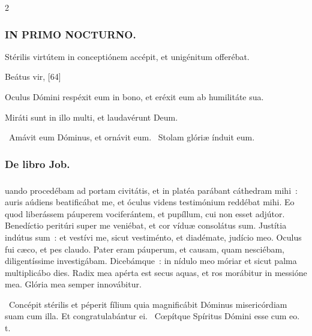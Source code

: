 \documentclass[9pt,twoside]{extarticle}
\begin{document}
\begin{multicols}{2}
{{\subsubsection*{\center \textsc{IN PRIMO NOCTURNO.}}
\begin{tightlist}{}
\item {} Stérilis virtútem in conceptiónem accépit, et unigénitum offerébat.
\item {} Beátus vir,  [64]
\item {} Oculus Dómini respéxit eum in bono, et eréxit eum ab humilitáte sua.
\item {} Miráti sunt in illo multi, et laudavérunt Deum.
\item {}~Amávit eum Dóminus, et ornávit eum. ~Stolam glóriæ índuit eum.
\item {}
\end{tightlist}

\subsubsection*{\center De libro Job.}
\subsubsection*{\center {}}
uando procedébam ad portam civitátis, et in platéa parábant cáthedram mihi~: auris aúdiens beatificábat me, et óculus videns testimónium reddébat mihi. Eo quod liberássem páuperem vociferántem, et pupíllum, cui non esset adjútor. Benedíctio peritúri super me veniébat, et cor víduæ consolátus sum. Justítia indútus sum~: et vestívi me, sicut vestiménto, et diadémate, judício meo. Oculus fui cæco, et pes claudo. Pater eram páuperum, et causam, quam nesciébam, diligentíssime investigábam. Dicebámque~: in nídulo meo móriar et sicut palma multiplicábo dies. Radix mea apérta est secus aquas, et ros morábitur in messióne mea. Glória mea semper innovábitur.

\begin{tightlist}{}
\item {}~Concépit stérilis et péperit fílium quia magnificábit Dóminus misericórdiam suam cum illa. \textred{*} Et congratulabántur ei. ~Cœpítque Spíritus Dómini esse cum eo. t.
\end{tightlist}

}}
\end{multicols}
\end{document}
